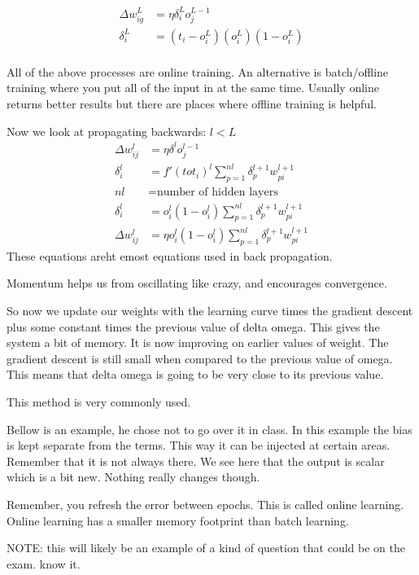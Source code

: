 \documentclass{article}
\begin{document}
\begin{align*}
	\Delta w_{ig}^L &= \eta \delta_i^L o_j^{L-1}\\
	\delta_i^L &= (t_i - o_i^L)(o_i^L)(1-o_i^L)\\
\end{align*}


All of the above processes are online training. An alternative is batch/offline training where you put all of the input in at the same time. Usually online returns better results but there are places where offline training is helpful.

Now we look at propagating backwards: $l < L$
\begin{align*}
	\Delta w_{ij}^l &= \eta \delta^lo_j^{l-1}\\
	\delta_i^l &= f'(tot_i)^l \sum_{p=1}^{nl} \delta_p^{l+1}w_{pi}^{l+1}\\
	nl &= \text{number of hidden layers}\\
	\delta_i^l &= o_i^l(1-o_i^l)\sum_{p=1}^{nl} \delta_p^{l+1}w_{pi}^{l+1}\\
	\Delta w_{ij}^l &= \eta o_i^l(1-o_i^l) \sum_{p=1}^{nl} \delta_p^{l+1}w_{pi}^{l+1}
\end{align*}
These equations areht emost equations used in back propagation.


Momentum helps us from oscillating like crazy, and encourages convergence.

So now we update our weights with the learning curve times the gradient descent plus some constant times the previous value of delta omega. This gives the system a bit of memory. It is now improving on earlier values of weight. The gradient descent is still small when compared to the previous value of omega. This means that delta omega is going to be very close to its previous value.

This method is very commonly used.

Bellow is an example, he chose not to go over it in class. In this example the bias is kept separate from the terms. This way it can be injected at certain areas. Remember that it is not always there. We see here that the output is scalar which is a bit new. Nothing really changes though.

Remember, you refresh the error between epochs. This is called online learning. Online learning has a smaller memory footprint than batch learning.

NOTE: this will likely be an example of a kind of question that could be on the exam. know it.
\end{document}
